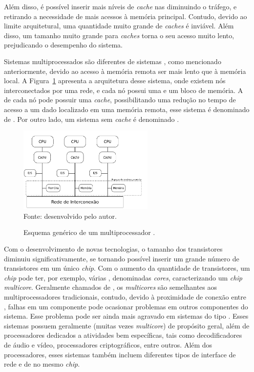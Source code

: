 Além disso, é possível inserir mais níveis de \textit{cache} nas \cpus
diminuindo o tráfego, e retirando a necessidade de mais acessos à memória
principal. Contudo, devido ao limite arquitetural, uma quantidade muito grande
de \textit{caches} é inviável. Além disso, um tamanho muito grande para
\textit{caches} torna o seu acesso muito lento, prejudicando o desempenho do
sistema.

Sistemas multiprocessados \numa são diferentes de sistemas \uma, como mencionado
anteriormente, devido ao acesso à memória remota ser mais lento que à memória
local. A Figura~\ref{fig:numa} apresenta a arquitetura desse sistema, onde
existem nós interconectados por uma rede, e cada nó possui uma \cpu e um bloco
de memória. A \cpu de cada nó pode possuir uma \textit{cache}, possibilitando
uma redução no tempo de acesso a um dado localizado em uma memória remota, esse
sistema é denominado de \ccnuma. Por outro lado, um sistema sem \textit{cache} é
denominado \ncnuma.

\begin{figure}[t]
	\centering
    \caption{Esquema genérico de um multiprocessador \numa.}
    \includegraphics[width=0.6\textwidth]{figs/multiprocNUMA.pdf} \\
    Fonte: desenvolvido pelo autor.
    \label{fig:numa}
\end{figure}

Com o desenvolvimento de novas tecnologias, o tamanho
dos transistores diminuiu significativamente, se tornando possível inserir um
grande número de transistores em um único \textit{chip}.
Com o aumento da quantidade de transistores, um \textit{chip} pode ter, por
exemplo, várias \cpus, denominadas \textit{cores}, caracterizando um
\textit{chip} \textit{multicore}.
Geralmente chamados de \cmps, os \textit{multicores} são semelhantes aos multiprocessadores
tradicionais, contudo, devido à proximidade de conexão entre \cpus, falhas em um
componente pode ocasionar problemas em outros componentes do sistema.
Esse problema pode ser ainda mais agravado em sistemas do tipo \mpsoc. Esses sistemas
possuem geralmente \cpus (muitas vezes \textit{multicore}) de propósito geral, além de processadores
dedicados a atividades bem específicas, tais como decodificadores de áudio e vídeo, processadores
criptográficos, entre outros. Além dos processadores, esses sistemas também incluem diferentes tipos
de interface de rede e de \es no mesmo \textit{chip}.

